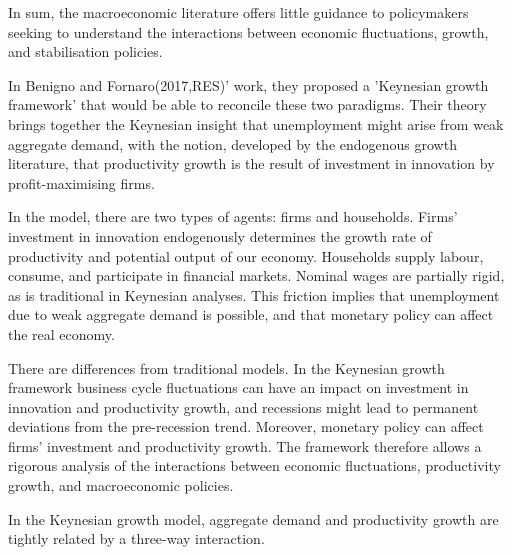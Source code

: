 \documentclass[cn,10pt,math=newtx,citestyle=gb7714-2015,bibstyle=gb7714-2015]{elegantbook}
\begin{document}
{{	In sum, the macroeconomic literature offers little guidance to policymakers seeking to understand the interactions between economic fluctuations, growth, and stabilisation policies.
	
	In Benigno and Fornaro(2017,RES)' work,  they proposed a 'Keynesian growth framework' that would be able to reconcile these two paradigms. Their theory brings together the Keynesian insight that unemployment might arise from weak aggregate demand, with the notion, developed by the endogenous growth literature, that productivity growth is the result of investment in innovation by profit-maximising firms.
	
	In the model, there are two types of agents: firms and households. Firms' investment in innovation endogenously determines the growth rate of productivity and potential output of our economy. Households supply labour, consume, and participate in financial markets. Nominal wages are partially rigid, as is traditional in Keynesian analyses. This friction implies that unemployment due to weak aggregate demand is possible, and that monetary policy can affect the real economy.
	
	There are differences from traditional models. In the Keynesian growth framework business cycle fluctuations can have an impact on investment in innovation and productivity growth, and recessions might lead to permanent deviations from the pre-recession trend. Moreover, monetary policy can affect firms’ investment and productivity growth. The framework therefore allows a rigorous analysis of the interactions between economic fluctuations, productivity growth, and macroeconomic policies.
	
	In the Keynesian growth model, aggregate demand and productivity growth are tightly related by a three-way interaction.
	
}}
\end{document}
